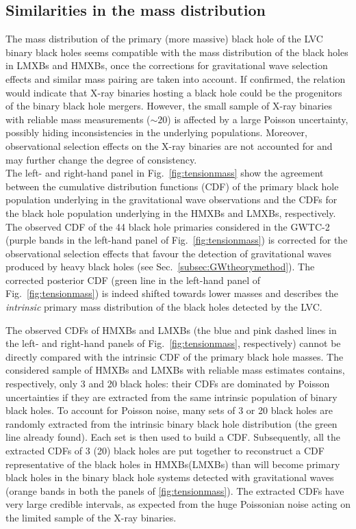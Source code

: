 \documentclass[a4paper,titlepage]{book}     	%
\begin{document}
\subsection{Similarities in the mass distribution}
The mass distribution of the primary (more massive) black hole of the LVC binary black holes seems compatible with the mass distribution of the black holes in LMXBs and HMXBs, once the corrections for gravitational wave selection effects and similar mass pairing are taken into account. If confirmed, the relation would indicate that X-ray binaries hosting a black hole could be the progenitors of the binary black hole mergers. However, the small sample of X-ray binaries with reliable mass measurements ($\sim 20$) is affected by a large Poisson uncertainty, possibly hiding inconsistencies in the underlying populations. Moreover, observational selection effects on the X-ray binaries are not accounted for and may further change the degree of consistency. \\

The left- and right-hand panel in Fig.\ \ref{fig:tensionmass} show the agreement between the cumulative distribution functions (CDF) of the primary black hole population underlying in the gravitational wave observations and the CDFs for the black hole population underlying in the HMXBs and LMXBs, respectively. The observed CDF of the 44 black hole primaries considered in the GWTC-2 (purple bands in the left-hand panel of Fig.\ \ref{fig:tensionmass}) is corrected for the observational selection effects that favour the detection of gravitational waves produced by heavy black holes (see Sec.\ \ref{subsec:GWtheorymethod}). The corrected posterior CDF (green line in the left-hand panel of Fig.\ \ref{fig:tensionmass}) is indeed shifted towards lower masses and describes the \textit{intrinsic} primary mass distribution of the black holes detected by the LVC. 

The observed CDFs of HMXBs and LMXBs (the blue and pink dashed lines in the left- and right-hand panels of Fig.\ \ref{fig:tensionmass}, respectively) cannot be directly compared with the intrinsic CDF of the primary black hole masses. The considered sample of HMXBs and LMXBs with reliable mass estimates contains, respectively, only 3 and 20 black holes: their CDFs are dominated by Poisson uncertainties if they are extracted from the same intrinsic population of binary black holes. To account for Poisson noise, many sets of 3 or 20 black holes are randomly extracted from the intrinsic binary black hole distribution (the green line already found). Each set is then used to build a CDF. Subsequently, all the extracted CDFs of 3 (20) black holes are put together to reconstruct a CDF representative of the black holes in HMXBs(LMXBs) than will become primary black holes in the binary black hole systems detected with gravitational waves (orange bands in both the panels of \ref{fig:tensionmass}). The extracted CDFs have very large credible intervals, as expected from the huge Poissonian noise acting on the limited sample of the X-ray binaries. \\
\end{document}
